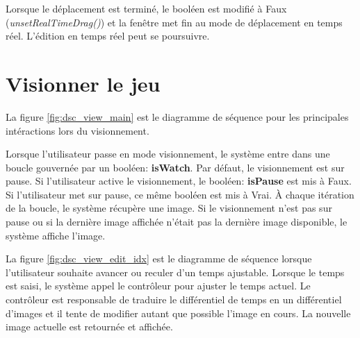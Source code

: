 Lorsque le déplacement est terminé, le booléen est modifié à Faux (\textit{unsetRealTimeDrag()}) et la fenêtre met fin au mode de déplacement en temps réel.
L'édition en temps réel peut se poursuivre.

\section{Visionner le jeu}
\label{sec:visionner_jeu}


La figure \ref{fig:dsc_view_main} est le diagramme de séquence pour les principales intéractions lors du visionnement.

Lorsque l'utilisateur passe en mode visionnement, le système entre dans une boucle gouvernée par un booléen: \textbf{isWatch}.
Par défaut, le visionnement est sur pause.
Si l'utilisateur active le visionnement, le booléen: \textbf{isPause} est mis à Faux.
Si l'utilisateur met sur pause, ce même booléen est mis à Vrai.
À chaque itération de la boucle, le système récupère une image.
Si le visionnement n'est pas sur pause ou si la dernière image affichée n'était pas la dernière image disponible, le système affiche l'image.


La figure \ref{fig:dsc_view_edit_idx} est le diagramme de séquence lorsque l'utilisateur souhaite avancer ou reculer d'un temps ajustable.
Lorsque le temps est saisi, le système appel le contrôleur pour ajuster le temps actuel.
Le contrôleur est responsable de traduire le différentiel de temps en un différentiel d'images et il tente de modifier autant que possible l'image en cours.
La nouvelle image actuelle est retournée et affichée.


